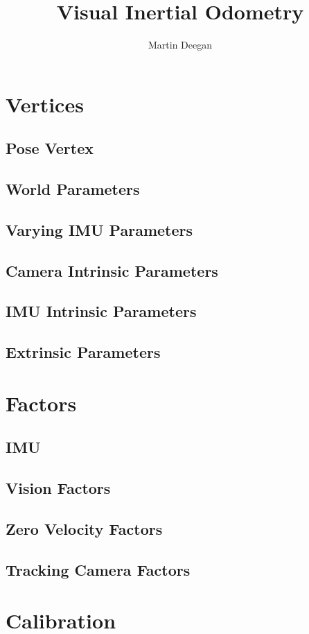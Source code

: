 \documentclass[11pt]{article}
\title{Visual Inertial Odometry}
\author{Martin Deegan}
\begin{document}
 
\maketitle
\tableofcontents

\section{Vertices}
\subsection{Pose Vertex}
\subsection{World Parameters}
\subsection{Varying IMU Parameters}
\subsection{Camera Intrinsic Parameters}
\subsection{IMU Intrinsic Parameters}
\subsection{Extrinsic Parameters}

\section{Factors}
\subsection{IMU}
\subsection{Vision Factors}
\subsection{Zero Velocity Factors}
\subsection{Tracking Camera Factors}
\section{Calibration}
\end{document}
